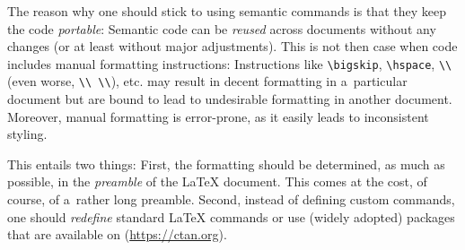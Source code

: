 \documentclass[11pt, a4paper, oneside]{article}
\renewcommand{\caps}[1]{{\textscale{0.97}{\textls[50]{\MakeUppercase{#1}}}}}
\theoremstyle{Plain}
\theoremstyle{Definition}
\theoremstyle{Remark}
\begin{document}
The reason why one should stick to using semantic commands is that they keep the code \emph{portable}: Semantic code can be \emph{reused} across documents without any changes (or at least without major adjustments). This is not then case when code includes manual formatting instructions: Instructions like \verb|\bigskip|, \verb|\hspace|, \verb|\\| (even worse, \verb|\\ \\|), etc. may result in decent formatting in a~particular document but are bound to lead to undesirable formatting in another document. Moreover, manual formatting is error-prone, as it easily leads to inconsistent styling.

This entails two things: First, the formatting should be determined, as much as possible, in the \emph{preamble} of the LaTeX document. This comes at the cost, of course, of a~rather long preamble. Second, instead of defining custom commands, one should \emph{redefine} standard LaTeX commands or use (widely adopted) packages that are available on \caps{CTAN} (\url{https://ctan.org}).
\end{document}
